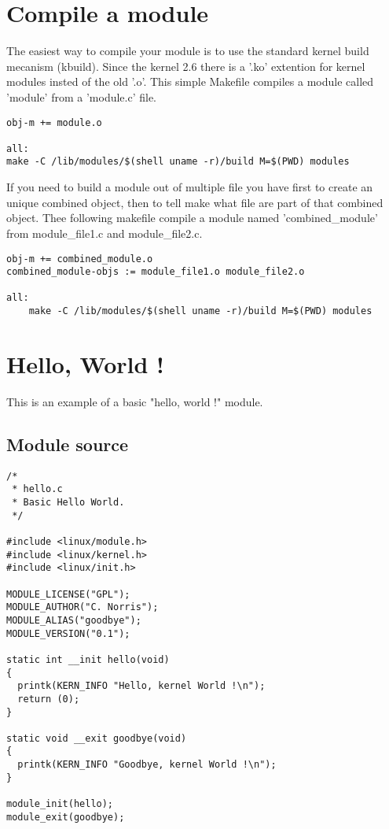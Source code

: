 \documentclass{article}
\begin{document}
\section{Compile a module}
The easiest way to compile your module is to use the standard kernel build
mecanism (kbuild). Since the kernel 2.6 there is a '.ko' extention for kernel 
modules insted of the old '.o'.
This simple Makefile compiles a module called 'module'
from a 'module.c' file.
\begin{lstlisting}
obj-m += module.o

all:
make -C /lib/modules/$(shell uname -r)/build M=$(PWD) modules
\end{lstlisting}
If you need to build a module out of multiple file you have first to
create an unique combined object, then to tell make what file are part
of that combined object. Thee following makefile compile a module 
named 'combined\_module' from module\_file1.c and module\_file2.c.
\begin{lstlisting}
obj-m += combined_module.o
combined_module-objs := module_file1.o module_file2.o

all:
    make -C /lib/modules/$(shell uname -r)/build M=$(PWD) modules
\end{lstlisting}

\section{Hello, World !}
This is an example of a basic "hello, world !" module.
\subsection{Module source}
\begin{lstlisting}
/*
 * hello.c
 * Basic Hello World.
 */

#include <linux/module.h>
#include <linux/kernel.h>
#include <linux/init.h>

MODULE_LICENSE("GPL");
MODULE_AUTHOR("C. Norris");
MODULE_ALIAS("goodbye");
MODULE_VERSION("0.1");

static int __init hello(void)
{
  printk(KERN_INFO "Hello, kernel World !\n");
  return (0);
}

static void __exit goodbye(void)
{
  printk(KERN_INFO "Goodbye, kernel World !\n");
}

module_init(hello);
module_exit(goodbye);
\end{lstlisting}
\end{document}
